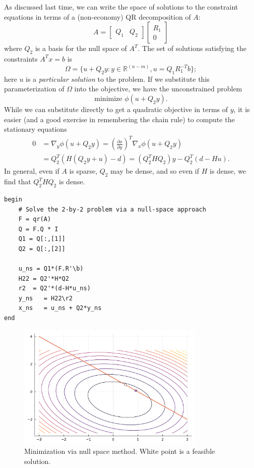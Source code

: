 \documentclass[12pt, leqno]{article} %
\begin{document}
As discussed last time, we can write the space of solutions to the
constraint equations in terms of a (non-economy) QR decomposition of
\(A\): \[A =
  \begin{bmatrix} Q_1 & Q_2 \end{bmatrix}
  \begin{bmatrix} R_1 \\ 0 \end{bmatrix}\] where \(Q_2\) is a basis for
the null space of \(A^T\). The set of solutions satisfying the
constraints \(A^T x = b\) is
\[\Omega = \{ u + Q_2 y : y \in {\mathbb{R}}^{(n-m)}, u = Q_1 R_1^{-T} b \};\]
here \(u\) is a \emph{particular solution} to the problem. If we
substitute this parameterization of \(\Omega\) into the objective, we
have the unconstrained problem \[\mbox{minimize } \phi(u + Q_2 y).\]
While we can substitute directly to get a quadratic objective in terms
of \(y\), it is easier (and a good exercise in remembering the chain
rule) to compute the stationary equations \begin{align*}
  0
  &= \nabla_y \phi(u + Q_2 y) 
  = \left(\frac{\partial x}{\partial y}\right)^T \nabla_x \phi(u+Q_2 y) \\
  &= Q_2^T (H (Q_2 y + u) - d) 
  = (Q_2^T H Q_2) y - Q_2^T (d-Hu).
\end{align*} In general, even if \(A\) is sparse, \(Q_2\) may be dense,
and so even if \(H\) is dense, we find that \(Q_2^T H Q_2\) is dense.

\begin{verbatim}
begin
    # Solve the 2-by-2 problem via a null-space approach
    F = qr(A)
    Q = F.Q * I
    Q1 = Q[:,[1]]
    Q2 = Q[:,[2]]
    
    u_ns = Q1*(F.R'\b)
    H22 = Q2'*H*Q2
    r2  = Q2'*(d-H*u_ns)
    y_ns   = H22\r2
    x_ns   = u_ns + Q2*y_ns
end
\end{verbatim}

\begin{figure}
\begin{center}
\includegraphics[width=0.8\textwidth]{fig/2023-04-26-qp-ns.pdf}
\end{center}
\caption{Minimization via null space method.  White point is a 
  feasible solution.}
\label{fig:qp-ns}
\end{figure}
\end{document}
